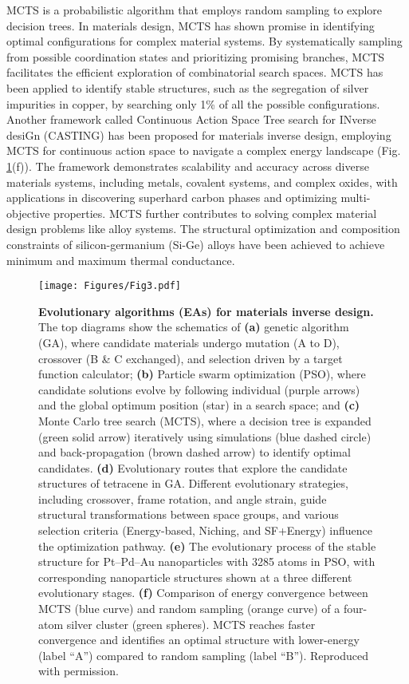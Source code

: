 \documentclass[fleqn,10pt]{wlscirep}
\begin{document}
MCTS is a probabilistic algorithm that employs random sampling to explore decision trees. In materials design, MCTS has shown promise in identifying optimal configurations for complex material systems. By systematically sampling from possible coordination states and prioritizing promising branches, MCTS facilitates the efficient exploration of combinatorial search spaces. 
MCTS has been applied to identify stable structures, such as the segregation of silver impurities in copper, by searching only 1\% of all the possible configurations\cite{kiyohara2018searching}. Another framework called Continuous Action Space Tree search for INverse desiGn (CASTING) has been proposed for materials inverse design, employing MCTS for continuous action space to navigate a complex energy landscape\cite{banik2023continuous} (Fig.\,\ref{fig3}(f)). The framework demonstrates scalability and accuracy across diverse materials systems, including metals, covalent systems, and complex oxides, with applications in discovering superhard carbon phases and optimizing multi-objective properties. MCTS further contributes to solving complex material design problems like alloy systems\cite{m2017mdts}. The structural optimization and composition constraints of silicon-germanium (Si-Ge) alloys have been achieved to achieve minimum and maximum thermal conductance. 


\begin{figure}[!htbp]
    \centering
    \texttt{[image: Figures/Fig3.pdf]}
    \caption{\textbf{Evolutionary algorithms (EAs) for materials inverse design.} The top diagrams show the schematics of \textbf{(a)} genetic algorithm (GA), where candidate materials undergo mutation (A to D), crossover (B \& C exchanged), and selection driven by a target function calculator; \textbf{(b)} Particle swarm optimization (PSO), where candidate solutions evolve by following individual (purple arrows) and the global optimum position (star) in a search space; and \textbf{(c)} Monte Carlo tree search (MCTS), where a decision tree is expanded (green solid arrow) iteratively using simulations (blue dashed circle) and back-propagation (brown dashed arrow) to identify optimal candidates. \textbf{(d)} Evolutionary routes that explore the candidate structures of tetracene in GA\cite{tom2023inverse}. Different evolutionary strategies, including crossover, frame rotation, and angle strain, guide structural transformations between space groups, and various selection criteria (Energy-based, Niching, and SF+Energy) influence the optimization pathway. \textbf{(e)} The evolutionary process of the stable structure for Pt–Pd–Au nanoparticles with 3285 atoms in PSO\cite{fan2015structural}, with corresponding nanoparticle structures shown at a three different evolutionary stages. \textbf{(f)} Comparison of energy convergence between MCTS (blue curve) and random sampling (orange curve) of a four-atom silver cluster (green spheres). MCTS reaches faster convergence and identifies an optimal structure with lower-energy (label ``A'') compared to random sampling (label ``B'')\cite{banik2023continuous}. Reproduced with permission\cite{tom2023inverse,fan2015structural,banik2023continuous}.}
    \label{fig3}
\end{figure}
\end{document}
